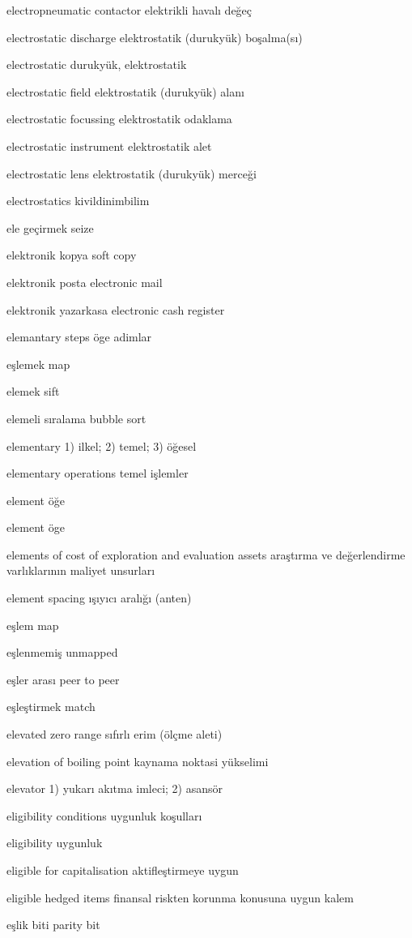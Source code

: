 \documentclass[12pt,fleqn]{article}\usepackage{../../common}
\begin{document}
electropneumatic contactor elektrikli havalı değeç

electrostatic discharge elektrostatik (durukyük) boşalma(sı)

electrostatic durukyük, elektrostatik

electrostatic field elektrostatik (durukyük) alanı

electrostatic focussing elektrostatik odaklama

electrostatic instrument elektrostatik alet

electrostatic lens elektrostatik (durukyük) merceği

electrostatics kivildinimbilim

ele geçirmek seize

elektronik kopya soft copy

elektronik posta electronic mail

elektronik yazarkasa electronic cash register

elemantary steps öge adimlar

eşlemek map

elemek sift

elemeli sıralama bubble sort

elementary 1) ilkel; 2) temel; 3) öğesel

elementary operations temel işlemler

element öğe

element öge

elements of cost of exploration and evaluation assets araştırma ve değerlendirme varlıklarının maliyet unsurları

element spacing ışıyıcı aralığı (anten)

eşlem map

eşlenmemiş unmapped

eşler arası peer to peer

eşleştirmek match

elevated zero range sıfırlı erim (ölçme aleti)

elevation of boiling point kaynama noktasi yükselimi

elevator 1) yukarı akıtma imleci; 2) asansör

eligibility conditions uygunluk koşulları

eligibility uygunluk

eligible for capitalisation aktifleştirmeye uygun

eligible hedged items finansal riskten korunma konusuna uygun kalem

eşlik biti parity bit
\end{document}
